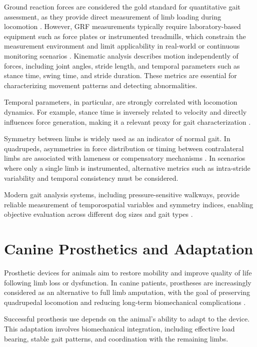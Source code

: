 Ground reaction forces are considered the gold standard for quantitative gait assessment, as they provide direct measurement of limb loading during locomotion \cite{McLaughlin2001, Budsberg1996}. However, GRF measurements typically require laboratory-based equipment such as force plates or instrumented treadmills, which constrain the measurement environment and limit applicability in real-world or continuous monitoring scenarios \cite{McLaughlin2001}.
Kinematic analysis describes motion independently of forces, including joint angles, stride length, and temporal parameters such as stance time, swing time, and stride duration. These metrics are essential for characterizing movement patterns and detecting abnormalities.

Temporal parameters, in particular, are strongly correlated with locomotion dynamics. For example, stance time is inversely related to velocity and directly influences force generation, making it a relevant proxy for gait characterization \cite{McLaughlin1994}.

Symmetry between limbs is widely used as an indicator of normal gait. In quadrupeds, asymmetries in force distribution or timing between contralateral limbs are associated with lameness or compensatory mechanisms \cite{Budsberg1996}. In scenarios where only a single limb is instrumented, alternative metrics such as intra-stride variability and temporal consistency must be considered.

Modern gait analysis systems, including pressure-sensitive walkways, provide reliable measurement of temporospatial variables and symmetry indices, enabling objective evaluation across different dog sizes and gait types \cite{Fahie2018}.

\section{Canine Prosthetics and Adaptation}

Prosthetic devices for animals aim to restore mobility and improve quality of life following limb loss or dysfunction. In canine patients, prostheses are increasingly considered as an alternative to full limb amputation, with the goal of preserving quadrupedal locomotion and reducing long-term biomechanical complications \cite{Wendland2019}.

Successful prosthesis use depends on the animal’s ability to adapt to the device. This adaptation involves biomechanical integration, including effective load bearing, stable gait patterns, and coordination with the remaining limbs.

